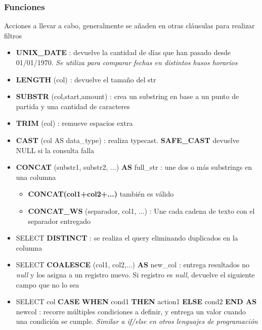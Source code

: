 \subsubsection{Funciones}
Acciones a llevar a cabo, generalmente se añaden en otras cláusulas para realizar filtros
\begin{itemize}
    \item {\textbf{UNIX\_DATE} : devuelve la cantidad de días que han pasado desde 01/01/1970. \textit{Se utiliza para comparar fechas en distintos husos horarios}}
    \item {\textbf{LENGTH} (col) : devuelve el tamaño del \gls{str}}
    \item {\textbf{SUBSTR} (col,start,amount) : crea un substring en base a un punto de partida y una cantidad de caracteres}
    \item {\textbf{TRIM} (col) : remueve espacios extra}
    \item {\textbf{CAST} (col AS data\_type) : realiza \gls{typecast}. \textbf{SAFE\_CAST} devuelve NULL si la consulta falla}
    \item {\textbf{CONCAT} (substr1, substr2, ...) \textbf{AS} full\_str : une dos o más substrings en una columna
    \begin{itemize}
        \item {\textbf{CONCAT(col1+col2+...)} también es válido}
        \item {\textbf{CONCAT\_WS} (separador, col1, ...) : Une cada cadena de texto con el separador entregado}
    \end{itemize}}
    \item {SELECT \textbf{DISTINCT} : se realiza el query eliminando duplicados en la columna}
    \item {SELECT \textbf{COALESCE} (col1, col2,...) \textbf{AS} new\_col : entrega resultados no \textit{null} y los asigna a un registro nuevo. Si registro es \textit{null}, devuelve el siguiente campo que no lo sea}
    \item {SELECT col \textbf{CASE} \textbf{WHEN} cond1 \textbf{THEN} action1 \textbf{ELSE} cond2 \textbf{END AS} newcol : recorre múltiples condiciones a definir, y entrega un valor cuando una condición se cumple. \textit{Similar a if/else en otros lenguajes de programación}}
\end{itemize}


